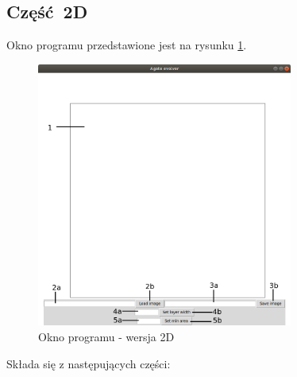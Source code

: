 \documentclass{article}
\begin{document}
\subsection{Część 2D}
Okno programu przedstawione jest na rysunku \ref{okno_programu_2d}.
\begin{figure}[H]
\caption{Okno programu - wersja 2D}
\label{okno_programu_2d}
\centering
\includegraphics[width=0.75\textwidth]{obrazy/okno_programu_2d.png}
\end{figure}
Składa się z następujących części:
\end{document}
